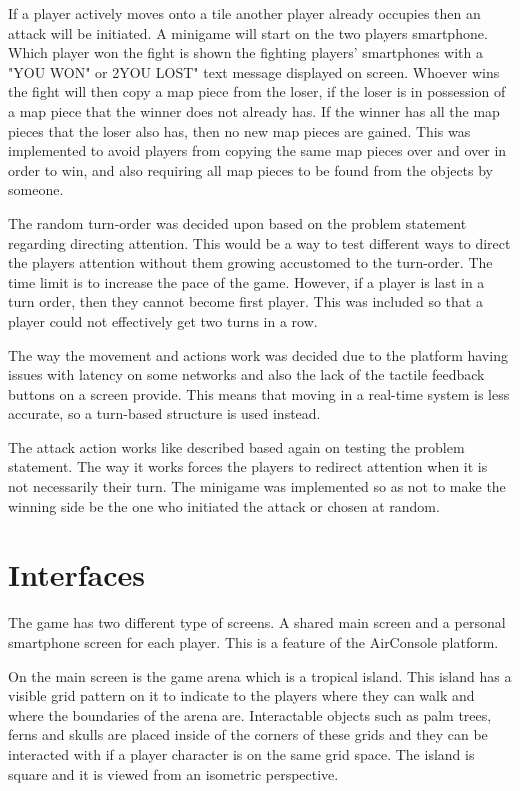 If a player actively moves onto a tile another player already occupies then an attack will be initiated. A minigame will start on the two players smartphone. Which player won the fight is shown the fighting players' smartphones with a "YOU WON" or 2YOU LOST" text message displayed on screen. Whoever wins the fight will then copy a map piece from the loser, if the loser is in possession of a map piece that the winner does not already has. If the winner has all the map pieces that the loser also has, then no new map pieces are gained. This was implemented to avoid players from copying the same map pieces over and over in order to win, and also requiring all map pieces to be found from the objects by someone.

The random turn-order was decided upon based on the problem statement regarding directing attention. This would be a way to test different ways to direct the players attention without them growing accustomed to the turn-order. The time limit is to increase the pace of the game. However, if a player is last in a turn order, then they cannot become first player. This was included so that a player could not effectively get two turns in a row.

The way the movement and actions work was decided due to the platform having issues with latency on some networks and also the lack of the tactile feedback buttons on a screen provide. This means that moving in a real-time system is less accurate, so a turn-based structure is used instead.

The attack action works like described based again on testing the problem statement. The way it works forces the players to redirect attention when it is not necessarily their turn. The minigame was implemented so as not to make the winning side be the one who initiated the attack or chosen at random.

\section{Interfaces}
The game has two different type of screens. A shared main screen and a personal smartphone screen for each player. This is a feature of the AirConsole platform.

On the main screen is the game arena which is a tropical island. This island has a visible grid pattern on it to indicate to the players where they can walk and where the boundaries of the arena are. Interactable objects such as palm trees, ferns and skulls are placed inside of the corners of these grids and they can be interacted with if a player character is on the same grid space. The island is square and it is viewed from an isometric perspective. 

